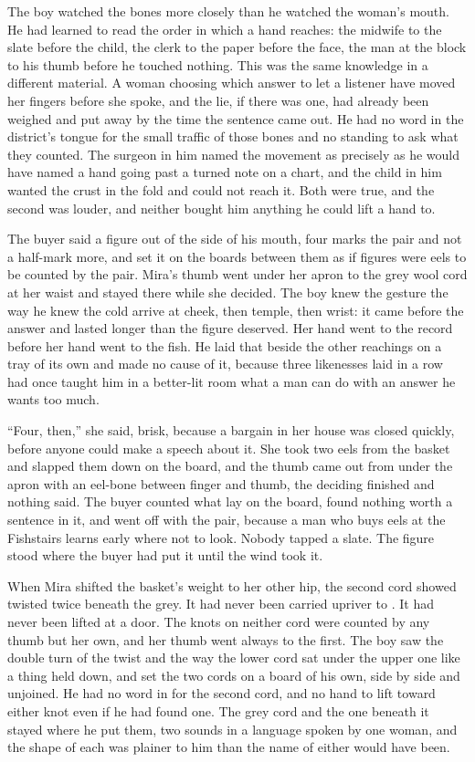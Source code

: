 The boy watched the bones more closely than he watched the woman's mouth. He had learned to read the order in which a hand reaches: the midwife to the slate before the child, the clerk to the paper before the face, the man at the block to his thumb before he touched nothing. This was the same knowledge in a different material. A woman choosing which answer to let a listener have moved her fingers before she spoke, and the lie, if there was one, had already been weighed and put away by the time the sentence came out. He had no word in the district's tongue for the small traffic of those bones and no standing to ask what they counted. The surgeon in him named the movement as precisely as he would have named a hand going past a turned note on a chart, and the child in him wanted the crust in the fold and could not reach it. Both were true, and the second was louder, and neither bought him anything he could lift a hand to.

\scenebreak

The buyer said a figure out of the side of his mouth, four marks the pair and not a half-mark more, and set it on the boards between them as if figures were eels to be counted by the pair. Mira's thumb went under her apron to the grey wool cord at her waist and stayed there while she decided. The boy knew the gesture the way he knew the cold arrive at cheek, then temple, then wrist: it came before the answer and lasted longer than the figure deserved. Her hand went to the record before her hand went to the fish. He laid that beside the other reachings on a tray of its own and made no cause of it, because three likenesses laid in a row had once taught him in a better-lit room what a man can do with an answer he wants too much.

“Four, then,” she said, brisk, because a bargain in her house was closed quickly, before anyone could make a speech about it. She took two eels from the basket and slapped them down on the board, and the thumb came out from under the apron with an eel-bone between finger and thumb, the deciding finished and nothing said. The buyer counted what lay on the board, found nothing worth a sentence in it, and went off with the pair, because a man who buys eels at the Fishstairs learns early where not to look. Nobody tapped a slate. The figure stood where the buyer had put it until the wind took it.

When Mira shifted the basket's weight to her other hip, the second cord showed twisted twice beneath the grey. It had never been carried upriver to . It had never been lifted at a door. The knots on neither cord were counted by any thumb but her own, and her thumb went always to the first. The boy saw the double turn of the twist and the way the lower cord sat under the upper one like a thing held down, and set the two cords on a board of his own, side by side and unjoined. He had no word in  for the second cord, and no hand to lift toward either knot even if he had found one. The grey cord and the one beneath it stayed where he put them, two sounds in a language spoken by one woman, and the shape of each was plainer to him than the name of either would have been.

